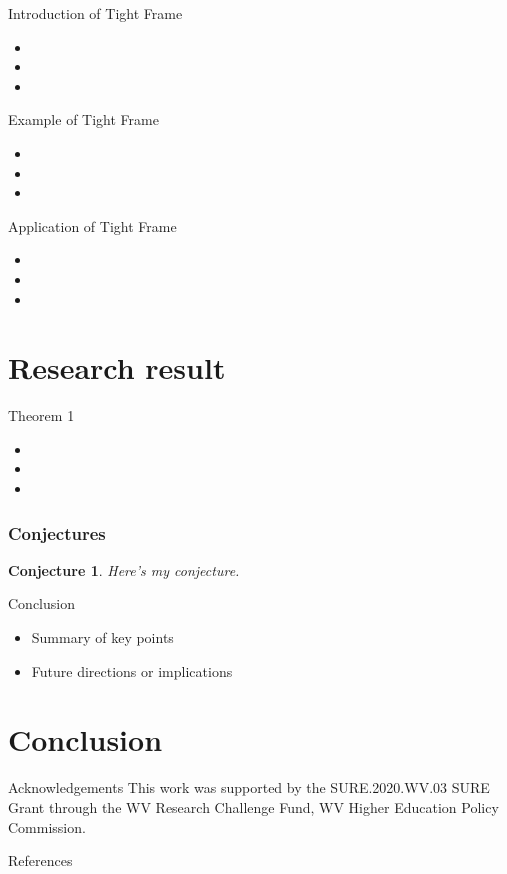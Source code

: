 \documentclass{beamer}
\newtheorem{conjecture}{Conjecture}
\begin{document}
\begin{frame}{Introduction of Tight Frame}
  \begin{itemize}
    \item 
    \item 
    \item 
  \end{itemize}
\end{frame}

\begin{frame}{Example of Tight Frame}
  \begin{itemize}
    \item 
    \item 
    \item 
  \end{itemize}
\end{frame}

\begin{frame}{Application of Tight Frame}
  \begin{itemize}
    \item 
    \item 
    \item 
  \end{itemize}
\end{frame}


\section{Research result}
\begin{frame}{Theorem 1}
  \begin{itemize}
    \item 
    \item 
    \item 
  \end{itemize}
\end{frame}
\begin{frame}
    \frametitle{Conjectures}
	\begin{conjecture}
	Here's my conjecture.
	\end{conjecture}
    
\end{frame}

\begin{frame}{Conclusion}
  \begin{itemize}
    \item Summary of key points
    \item Future directions or implications
  \end{itemize}
\end{frame}

\section{Conclusion}
\begin{frame}{Acknowledgements}
    This work was supported by the SURE.2020.WV.03 SURE Grant through the WV Research Challenge Fund, WV Higher Education Policy Commission.
\end{frame}


\begin{frame}{References}
  
    \printbibliography

\end{frame}
\end{document}

